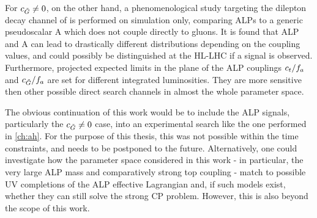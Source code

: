 For $c_{\tilde{G}} \neq 0$, on the other hand, a phenomenological study targeting the dilepton decay channel of \ttbar is performed on simulation only, comparing ALPs to a generic pseudoscalar A which does not couple directly to gluons. It is found that ALP and A can lead to drastically different \mtt distributions depending on the coupling values, and could possibly be distinguished at the HL-LHC if a signal is observed. Furthermore, projected expected limits in the plane of the ALP couplings $c_t/f_a$ and $c_{\tilde{G}}/f_a$ are set for different integrated luminosities. They are more sensitive then other possible direct search channels in almost the whole parameter space.

The obvious continuation of this work would be to include the ALP signals, particularly the $c_{\tilde{G}} \neq 0$ case, into an experimental search like the one performed in \cref{ch:ah}. For the purpose of this thesis, this was not possible within the time constraints, and needs to be postponed to the future. Alternatively, one could investigate how the parameter space considered in this work - in particular, the very large ALP mass and comparatively strong top coupling - match to possible UV completions of the ALP effective Lagrangian and, if such models exist, whether they can still solve the strong CP problem. However, this is also beyond the scope of this work.